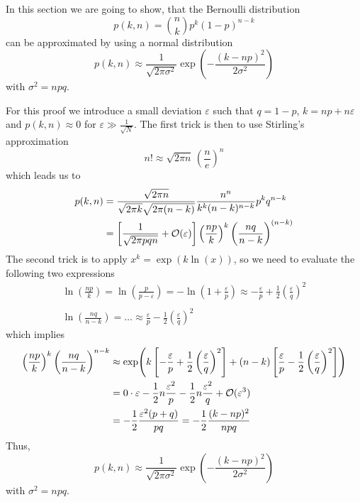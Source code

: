 \documentclass{notebook}
\begin{document}
In this section we are going to show, that the Bernoulli distribution 
%
\begin{equation}
p(k,n) = \binom{n}{k} p^k (1 - p)^{n - k}
\end{equation}
%
can be approximated by using a normal distribution
%
\begin{equation}
p(k,n) \approx \frac{1}{\sqrt{2 \pi \sigma^2}} \exp(-\frac{(k-np)^2}{2 \sigma^2})
\end{equation}
%
with $\sigma^2 = npq$. 

For this proof we introduce a small deviation $\varepsilon$ such that $q = 1-p$, $k = np + n \varepsilon$ and $p(k,n) \approx 0$ for $\varepsilon \gg \frac{1}{\sqrt{N}}$. The first trick is then to use Stirling's approximation 
%
\begin{equation}
n! \approx \sqrt{2\pi n} \, \left( \frac{n}{e} \right)^n
\end{equation}
%
which leads us to
%
\begin{align*}
	p(k,n) &= \frac{\sqrt{2\pi n}}{\sqrt{2\pi k}\sqrt{2\pi (n-k)}} \frac{n^n}{k^k (n-k)^{n-k}} p^k q^{n-k}  \\
	&= \left[\frac{1}{\sqrt{2 \pi p q n}} + \mathcal{O}(\varepsilon) \right] \left( \frac{np}{k} \right)^k \left( \frac{nq}{n-k} \right)^{(n-k)}	
\end{align*}
%
The second trick is to apply $x^k = \exp(k \ln(x))$, so we need to evaluate the following two expressions
%
\begin{gather*}
	\ln(\frac{np}{k}) = \ln(\frac{p}{p-\varepsilon}) = -\ln(1+\frac{\varepsilon}{p}) \approx - \frac{\varepsilon}{p} + \frac{1}{2} \left( \frac{\varepsilon}{q} \right)^2 \\ \\
	\ln(\frac{nq}{n-k}) = \hdots \approx \frac{\varepsilon}{p} - \frac{1}{2} \left( \frac{\varepsilon}{q} \right)^2
\end{gather*}
%
which implies
%
\begin{align*}
	\left( \frac{np}{k} \right)^k \left( \frac{nq}{n-k} \right)^{n-k} &\approx \exp(k \left[ - \frac{\varepsilon}{p} + \frac{1}{2} \left( \frac{\varepsilon}{q} \right)^2 \right] + (n-k) \left[ \frac{\varepsilon}{p} - \frac{1}{2} \left( \frac{\varepsilon}{q} \right)^2 \right]) \\
	&= 0 \cdot \varepsilon - \frac{1}{2} n \frac{\varepsilon^2}{p} - \frac{1}{2} n \frac{\varepsilon^2}{q} + \mathcal{O}(\varepsilon^3) \\
	&= - \frac{1}{2} \frac{\varepsilon^2(p+q)}{pq} = -\frac{1}{2} \frac{(k-np)^2}{npq}
\end{align*}
%
Thus,
%
\begin{equation}
p(k,n) \approx \frac{1}{\sqrt{2 \pi \sigma^2}} \exp(-\frac{(k-np)^2}{2 \sigma^2})
\end{equation}
%
with $\sigma^2 = npq$.
\end{document}
